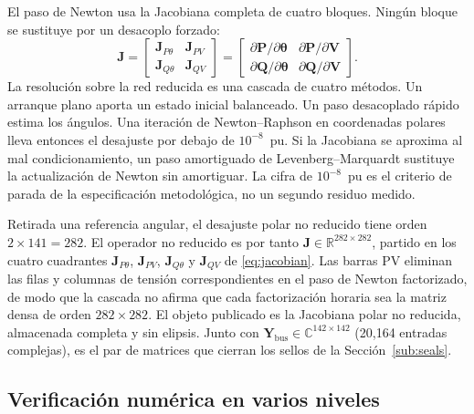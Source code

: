 El paso de Newton usa la Jacobiana completa de cuatro bloques. Ningún bloque se sustituye por un desacoplo forzado:
\begin{equation}
\mathbf{J} =
\begin{bmatrix}
\mathbf{J}_{P\theta} & \mathbf{J}_{PV} \\
\mathbf{J}_{Q\theta} & \mathbf{J}_{QV}
\end{bmatrix}
=
\begin{bmatrix}
\partial \mathbf{P} / \partial \boldsymbol{\theta} & \partial \mathbf{P} / \partial \mathbf{V} \\[4pt]
\partial \mathbf{Q} / \partial \boldsymbol{\theta} & \partial \mathbf{Q} / \partial \mathbf{V}
\end{bmatrix}.
\label{eq:jacobian}
\end{equation}
La resolución sobre la red reducida es una cascada de cuatro métodos. Un arranque plano aporta un estado inicial balanceado. Un paso desacoplado rápido estima los ángulos. Una iteración de Newton--Raphson en coordenadas polares lleva entonces el desajuste por debajo de $10^{-8}$~pu. Si la Jacobiana se aproxima al mal condicionamiento, un paso amortiguado de Levenberg--Marquardt sustituye la actualización de Newton sin amortiguar. La cifra de $10^{-8}$~pu es el criterio de parada de la especificación metodológica, no un segundo residuo medido.


Retirada una referencia angular, el desajuste polar no reducido tiene orden $2\times 141=282$. El operador no reducido es por tanto $\mathbf{J}\in\mathbb{R}^{282\times 282}$, partido en los cuatro cuadrantes $\mathbf{J}_{P\theta}$, $\mathbf{J}_{PV}$, $\mathbf{J}_{Q\theta}$ y $\mathbf{J}_{QV}$ de \eqref{eq:jacobian}. Las barras PV eliminan las filas y columnas de tensión correspondientes en el paso de Newton factorizado, de modo que la cascada no afirma que cada factorización horaria sea la matriz densa de orden $282\times 282$. El objeto publicado es la Jacobiana polar no reducida, almacenada completa y sin elipsis. Junto con $\mathbf{Y}_{\mathrm{bus}}\in\mathbb{C}^{142\times 142}$ (20,164 entradas complejas), es el par de matrices que cierran los sellos de la Sección~\ref{sub:seals}.

\subsection{Verificación numérica en varios niveles}
\label{sub:trinity}

